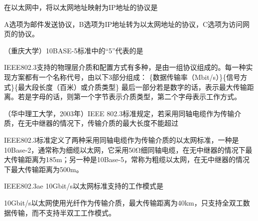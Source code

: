 \question 在以太网中，将以太网地址映射为IP地址的协议是
\par{}
\begin{solution}A选项为邮件发送协议，B选项为IP地址转为以太网地址的协议，C选项为访问网页的协议。
\end{solution}
\question （重庆大学）10BASE-5标准中的``5''代表的是
\par{}
\begin{solution}IEEE802.3支持的物理层介质和配置方式有多种，是由一组协议组成的。每一种实现方案都有一个名称代号，由以下3部分组成：
\{数据传输率（Mbit/s）\}\{信号方式\}\{最大段长度（百米）或介质类型\}
最后一部分若是数字的话，表示最大传输距离。若是字母的话，则第一个字节表示介质类型，第二个字母表示工作方式。
\end{solution}
\question （华中理工大学，2003年）IEEE
802.3标准规定，若采用同轴电缆作为传输介质，在无中继器的情况下，传输介质的最大长度不能超过
\par{}
\begin{solution}IEEE802.3标准定义了两种采用同轴电缆作为传输介质的以太网标准，一种是10Base-2，通常称为细缆以太网，它采用50Ω细同轴电缆，在无中继器的情况下最大传输距离为185m；另一种是10Base-5，常称为粗缆以太网，在无中继器的情况下最大传输距离为500m。
\end{solution}
\question IEEE802.3ae 10Gbit/s以太网标准支持的工作模式是
\par{}
\begin{solution}10Gbit/s以太网使用光纤作为传输介质，最大传输距离为40km，只支持全双工数据传输，而不支持半双工工作模式。
\end{solution}
